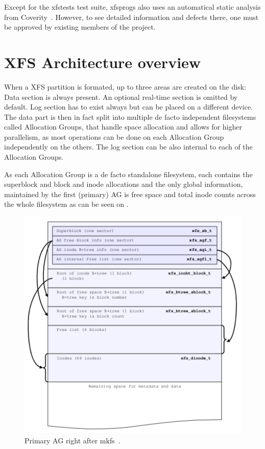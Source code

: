Except for the xfstests test suite, xfsprogs also uses an automatical static analysis from Coverity~\cite{CoverityXfsprogs}. However, to see detailed information and defects there, one must be approved by existing members of the project.


\section{XFS Architecture overview}\label{chap:xfs:overview}

When a XFS partition is formated, up to three areas are created on the disk: Data section is always present. An optional real-time section is omitted by default. Log section has to exist always but can be placed on a different device. The data part is then in fact split into multiple de facto independent filesystems called Allocation Groups, that handle space allocation and allows for higher parallelism, as most operations can be done on each Allocation Group independently on the others. The log section can be also internal to each of the Allocation Groups.

As each Allocation Group is a de facto standalone filesystem, each contains
the superblock and block and inode allocations and the only global
information, maintained by the first (primary) AG is free space and total
inode counts across the whole filesystem as can be seen
on .

\begin{figure}
  \centering
 \includegraphics[width=13cm,keepaspectratio]{fig/primary-ag} %
 \caption{Primary AG right after mkfs~\cite[Ch. 3]{xfsStructure}.}
\label{fig:xfs:primaryAG}
\end{figure}
	
